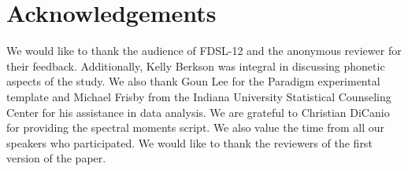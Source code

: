 \documentclass[output=paper,modfonts,nonflat,
]{langsci/langscibook}
\begin{document}
\section*{Acknowledgements}

We would like to thank the audience of FDSL-12 and the anonymous reviewer for their feedback. Additionally, Kelly Berkson was integral in discussing phonetic aspects of the study. We also thank Goun Lee for the Paradigm experimental template and Michael Frisby from the Indiana University Statistical Counseling Center for his assistance in data analysis. We are grateful to Christian DiCanio for providing the spectral moments script. We also value the time from all our speakers who participated. We would like to thank the reviewers of the first version of the paper.

\sloppy
\printbibliography[heading=subbibliography,notkeyword=this]
\end{document}
